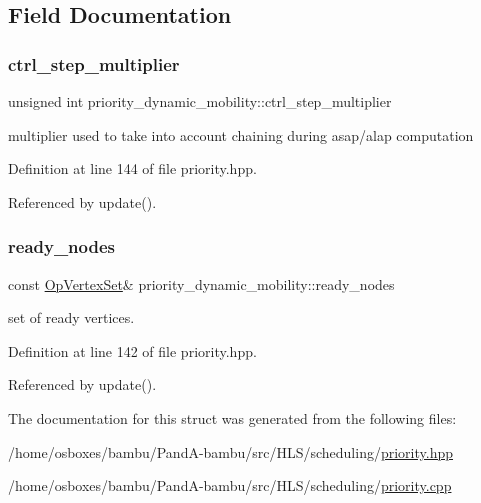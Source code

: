 \subsection{Field Documentation}
\mbox{\label{structpriority__dynamic__mobility_a71a4bfc266df1f5ab01e0eea02568ce1}} 
\subsubsection{\texorpdfstring{ctrl\+\_\+step\+\_\+multiplier}{ctrl\_step\_multiplier}}
{\footnotesize\ttfamily unsigned int priority\+\_\+dynamic\+\_\+mobility\+::ctrl\+\_\+step\+\_\+multiplier\hspace{0.3cm}{\ttfamily [private]}}



multiplier used to take into account chaining during asap/alap computation 



Definition at line 144 of file priority.\+hpp.



Referenced by update().

\mbox{\label{structpriority__dynamic__mobility_a574e2c82969dbb0a3de2b19f5488c37e}} 
\subsubsection{\texorpdfstring{ready\+\_\+nodes}{ready\_nodes}}
{\footnotesize\ttfamily const \hyperlink{classOpVertexSet}{Op\+Vertex\+Set}\& priority\+\_\+dynamic\+\_\+mobility\+::ready\+\_\+nodes\hspace{0.3cm}{\ttfamily [private]}}



set of ready vertices. 



Definition at line 142 of file priority.\+hpp.



Referenced by update().



The documentation for this struct was generated from the following files\+:\begin{DoxyCompactItemize}
\item 
/home/osboxes/bambu/\+Pand\+A-\/bambu/src/\+H\+L\+S/scheduling/\hyperlink{priority_8hpp}{priority.\+hpp}\item 
/home/osboxes/bambu/\+Pand\+A-\/bambu/src/\+H\+L\+S/scheduling/\hyperlink{priority_8cpp}{priority.\+cpp}\end{DoxyCompactItemize}

